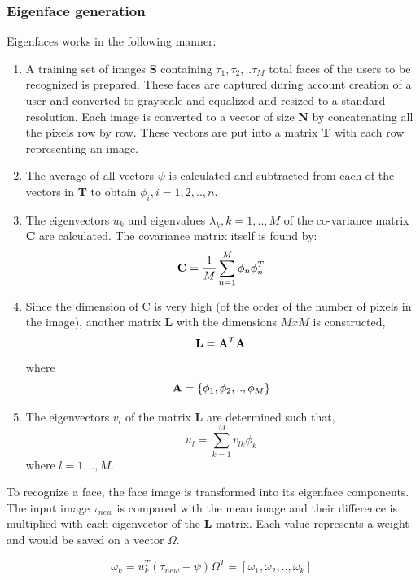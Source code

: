 \documentclass[%
        submission,
        notitlepage,
        narroweqnarray,
        inline,
        ]{ieee}
\begin{document}
\subsubsection{ Eigenface generation }
Eigenfaces works in the following manner:
\begin{enumerate}
	\item A training set of images {\bf S} containing $\tau_{1},\tau_{2},..\tau_{M}$ total faces of the users to be recognized is prepared. These faces are captured during account creation of a user and converted to grayscale and equalized and resized to a standard resolution. Each image is converted to a vector of size {\bf N} by concatenating all the pixels row by row. These vectors are put into a matrix {\bf T} with each row representing an image.
	\item The average of all vectors $\psi$ is calculated and subtracted from each of the vectors in {\bf T} to obtain $\phi_{i}, i = 1,2,..,n$.
	\item The eigenvectors $u_{k}$ and eigenvalues $\lambda_{k}, k = 1,..,M$ of the co-variance matrix {\bf C} are calculated. The covariance matrix itself is found by: 
\begin{equation}
{\bf C} = \frac{1}{M}\sum_{n=1}^{M}\phi_{n}\phi_{n}^{T}
\end{equation}
	\item Since the dimension of C is very high (of the order of the number of pixels in the image), another matrix {\bf L} with the dimensions $MxM$ is constructed, 
	\begin{equation}
	{\bf L} = {\bf A}^{T}{\bf A}
	\end{equation}
	where 
	\begin{equation}
	{\bf A} = \{\phi_{1},\phi_{2},..,\phi_{M}\}
	\end{equation}
	\item The eigenvectors $v_{l}$ of the matrix {\bf L} are determined such that,
	\begin{equation}
	u_{l} = \sum_{k=1}^{M}v_{lk}\phi_{k} 
	\end{equation}
where $l = 1,..,M$.
\end{enumerate}

To recognize a face, the face image is transformed into its eigenface components. The input image $\tau_{new}$ is compared with the mean image and their difference is multiplied with each eigenvector of the {\bf L} matrix. Each value represents a weight and would be saved on a vector $\Omega$.

\begin{equation}
\omega_{k} = u_{k}^{T}(\tau_{new} - \psi)	\Omega^{T} = [\omega_{1},\omega_{2},..,\omega_{k}] 
\end{equation}
\end{document}
